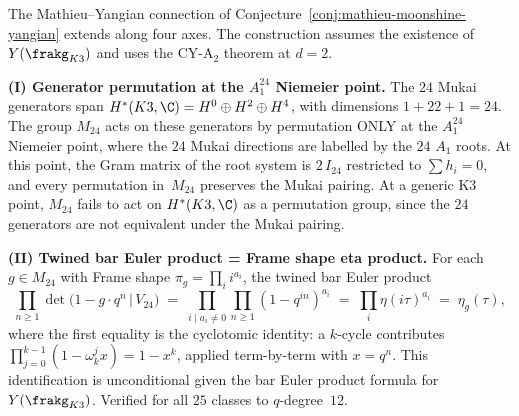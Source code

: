 \begin{conjecture}
\label{conj:mathieu-yangian-deeper}
The Mathieu--Yangian connection of
Conjecture~\ref{conj:mathieu-moonshine-yangian} extends along four
axes. The construction assumes the existence of \(Y(\frakg_{K3})\) and
uses the CY-A$_2$ theorem at \(d=2\).

\medskip\noindent
\textbf{(I) Generator permutation at the $A_1^{24}$ Niemeier point.}
The $24$ Mukai generators span $H^*(K3, \C) = H^0 \oplus H^2 \oplus H^4$,
with dimensions $1 + 22 + 1 = 24$. The group $M_{24}$ acts on these
generators by permutation ONLY at the $A_1^{24}$ Niemeier point, where
the $24$ Mukai directions are labelled by the $24$ $A_1$ roots. At this
point, the Gram matrix of the root system is $2\, I_{24}$ restricted to
$\sum h_i = 0$, and every permutation in~$M_{24}$ preserves the Mukai
pairing. At a generic K3 point, $M_{24}$ fails to act on $H^*(K3, \C)$
as a permutation group, since the $24$ generators are not equivalent
under the Mukai pairing.

\medskip\noindent
\textbf{(II) Twined bar Euler product = Frame shape eta product.}
For each $g \in M_{24}$ with Frame shape $\pi_g = \prod_i i^{a_i}$,
the twined bar Euler product
\begin{equation}\label{eq:twined-bar-euler-cyclotomic}
\prod_{n \geq 1} \det\bigl(1 - g \cdot q^n \,\big|\, V_{24}\bigr)
\;=\; \prod_{i \mid a_i \neq 0} \prod_{n \geq 1} (1 - q^{in})^{a_i}
\;=\; \prod_{i} \eta(i\tau)^{a_i}
\;=\; \eta_g(\tau),
\end{equation}
where the first equality is the cyclotomic identity: a $k$-cycle
contributes $\prod_{j=0}^{k-1}(1 - \omega_k^j x) = 1 - x^k$, applied
term-by-term with $x = q^n$. This identification is unconditional given
the bar Euler product formula for $Y(\frakg_{K3})$. Verified for all
$25$ classes to $q$-degree~$12$.


\end{conjecture}
